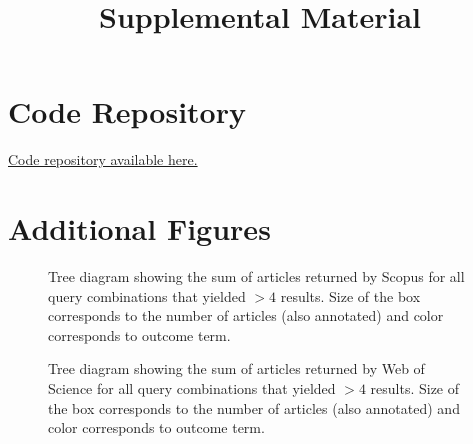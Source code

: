 \documentclass[12pt]{report}
\title{Supplemental Material}
\begin{document}

\section*{Code Repository}
\href{https://github.com/aims-umich/2025-panczyk-slr}{Code repository available here.}

\section*{Additional Figures}

\begin{figure}[ht]
    \centering
    \resizebox{\textwidth}{!}{}
    \caption{Tree diagram showing the sum of articles returned by Scopus for all query combinations that yielded $> 4$ results. Size of the box corresponds to the number of articles (also annotated) and color corresponds to outcome term.}
    \label{fig:tree_scopus}
\end{figure}

\begin{figure}[ht]
    \resizebox{\textwidth}{!}{}
    \caption{Tree diagram showing the sum of articles returned by Web of Science for all query combinations that yielded $> 4$ results. Size of the box corresponds to the number of articles (also annotated) and color corresponds to outcome term.}
    \label{fig:tree_wos}
\end{figure}
\end{document}
